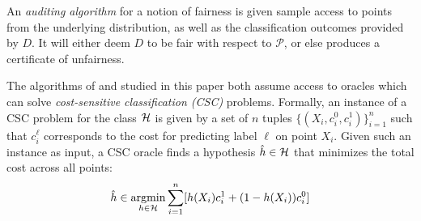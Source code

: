 An \emph{auditing algorithm} for a notion of fairness is given sample access to points from the underlying distribution, as well as the classification outcomes provided by $D$. It will either deem $D$ to be fair with respect to $\mathcal{P}$, or else produces a certificate of unfairness.
%
%


The algorithms of \citet{MSR} and \citet{KNRW18} studied in this paper both assume access to oracles which can solve \emph{cost-sensitive classification
  (CSC)} problems. Formally, an instance of a CSC problem for the
class $\mathcal{H}$ is given by a set of $n$ tuples
$\{(X_i, c_i^0, c_i^1)\}_{i=1}^n$ such that $c_i^\ell$ corresponds to
the cost for predicting label $\ell$ on point $X_i$. Given such an
instance as input, a CSC oracle finds a hypothesis $\hat h \in \mathcal{H}$ that
minimizes the total cost across all points:
\begin{equation}
  \hat h \in \operatorname*{\mathrm{argmin}}_{h\in \mathcal{H}} \sum_{i = 1}^n [h(X_i) c_i^1 + (1 -
  h(X_i)) c_i^0]\label{csc}
\end{equation}

